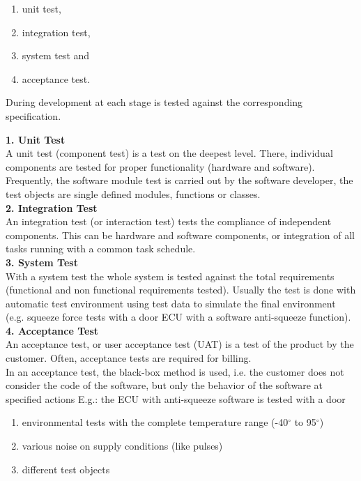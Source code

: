 \begin{enumerate}
\item  unit test,
\item  integration test, 
\item  system test and 
\item  acceptance test.
\end{enumerate}

During development at each stage is tested against the corresponding specification.\\
\newpage

\textbf{1. Unit Test}\\

A unit test (component test) is a test on the deepest level. There, individual components are tested for proper functionality (hardware and software). Frequently, the software module test is carried out by the software developer, the test objects are single defined modules, functions or classes.\\

\textbf{2. Integration Test}\\

An integration test (or interaction test) tests the compliance of independent components. This can be hardware and software components, or integration of all tasks running with a common task schedule.\\

\textbf{3. System Test}\\

With a system test the whole system is tested against the total requirements (functional and non functional requirements tested). Usually the test is done with automatic test environment using test data to simulate the final environment (e.g. squeeze force tests with a door ECU with a software anti-squeeze function).\\

\textbf{ 4. Acceptance Test}\\

An acceptance test, or user acceptance test (UAT) is a test of the product by the customer. Often, acceptance tests are required for billing. \\
In an acceptance test, the black-box method is used, i.e. the customer does not consider the code of the software, but only the behavior of the software at specified actions E.g.: the ECU with anti-squeeze software is tested with a door

\begin{enumerate}
\item  environmental tests with the complete temperature range (-40$\mathrm{{}^\circ}$ to 95$\mathrm{{}^\circ}$)
\item  various noise on supply conditions (like pulses)
\item  different test objects
\end{enumerate}

